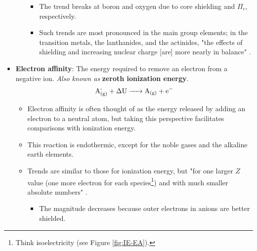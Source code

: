 \documentclass[../main.tex]{subfiles}
\begin{document}
\begin{itemize}
\begin{itemize}
\begin{itemize}
            \item The trend breaks at boron and oxygen due to core shielding and $\Pi_c$, respectively.
            \item Such trends are most pronounced in the main group elements; in the transition metals, the lanthanides, and the actinides, "the effects of shielding and increasing nuclear charge [are] more nearly in balance" \parencite[37]{bib:MiesslerFischerTarr}.
        \end{itemize}
    \end{itemize}
    \item \textbf{Electron affinity}: The energy required to remove an electron from a negative ion. \emph{Also known as} \textbf{zeroth ionization energy}.
    \begin{equation*}
        \ce{{A^-_{(g)}} + \Delta U -> A_{(g)} + e-}
    \end{equation*}
    \begin{itemize}
        \item Electron affinity is often thought of as the energy released by adding an electron to a neutral atom, but taking this perspective facilitates comparisons with ionization energy.
        \item This reaction is endothermic, except for the noble gases and the alkaline earth elements.
        \item Trends are similar to those for ionization energy, but "for one larger $Z$ value (one more electron for each species\footnote{Think isoelectricity (see Figure \ref{fig:IE-EA}).}) and with much smaller absolute numbers" \parencite[37]{bib:MiesslerFischerTarr}.
        \begin{itemize}
            \item The magnitude decreases because outer electrons in anions are better shielded.
        \end{itemize}
    \end{itemize}
    \pagebreak
    \begin{figure}[h!]
        \centering
\end{figure}
\end{itemize}
\end{document}
